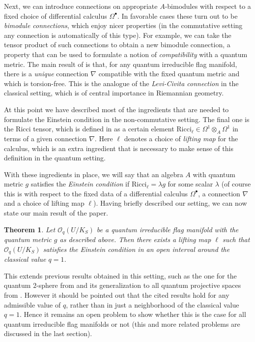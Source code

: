\documentclass[a4paper,12pt,reqno,english]{amsart}
\numberwithin{equation}{section}
\numberwithin{figure}{section}
\theoremstyle{plain}
\theoremstyle{plain}
\newtheorem*{theorem*}{Theorem}
\theoremstyle{plain}
\theoremstyle{plain}
\theoremstyle{plain}
\theoremstyle{definition}
\theoremstyle{definition}
\theoremstyle{definition}
\theoremstyle{remark}
\theoremstyle{definition}
\newcommand{\Oqflag}{\mathcal{O}_q(U / K_S)}
\newcommand{\Ricci}{\mathrm{Ricci}}
\begin{document}
Next, we can introduce connections on appropriate $A$-bimodules with respect to a fixed choice of differential calculus $\Omega^\bullet$.
In favorable cases these turn out to be \emph{bimodule connections}, which enjoy nicer properties (in the commutative setting any connection is automatically of this type).
For example, we can take the tensor product of such connections to obtain a new bimodule connection, a property that can be used to formulate a notion of \emph{compatibility} with a quantum metric.
The main result of \cite{levicivita-irreducible} is that, for any quantum irreducible flag manifold, there is a \emph{unique} connection $\nabla$ compatible with the fixed quantum metric and which is torsion-free.
This is the analogue of the \emph{Levi-Civita connection} in the classical setting, which is of central importance in Riemannian geometry.

At this point we have described most of the ingredients that are needed to formulate the Einstein condition in the non-commutative setting.
The final one is the Ricci tensor, which is defined in \cite[Section 8.1]{quantum-book} as a certain element $\Ricci_\ell \in \Omega^1 \otimes_A \Omega^1$ in terms of a given connection $\nabla$.
Here $\ell$ denotes a choice of \emph{lifting map} for the calculus, which is an extra ingredient that is necessary to make sense of this definition in the quantum setting.

With these ingredients in place, we will say that an algebra $A$ with quantum metric $g$ satisfies the \emph{Einstein condition} if $\Ricci_\ell = \lambda g$ for some scalar $\lambda$ (of course this is with respect to the fixed data of a differential calculus $\Omega^\bullet$, a connection $\nabla$ and a choice of lifting map $\ell$).
Having briefly described our setting, we can now state our main result of the paper.

\begin{theorem*}
Let $\Oqflag$ be a quantum irreducible flag manifold with the quantum metric $g$ as described above.
Then there exists a lifting map $\ell$ such that $\Oqflag$ satisfies the Einstein condition in an open interval around the classical value $q = 1$.
\end{theorem*}

This extends previous results obtained in this setting, such as the one for the quantum $2$-sphere from \cite[Section 8.2.3]{quantum-book} and its generalization to all quantum projective spaces from \cite{matassa-riemannian}.
However it should be pointed out that the cited results hold for any admissible value of $q$, rather than in just a neighborhood of the classical value $q = 1$.
Hence it remains an open problem to show whether this is the case for all quantum irreducible flag manifolds or not (this and more related problems are discussed in the last section).
\end{document}
